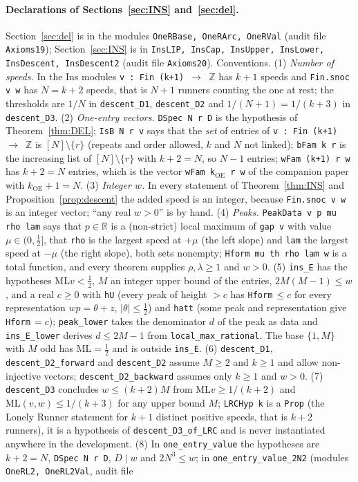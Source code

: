 \documentclass[11pt]{article}
\theoremstyle{definition}
\theoremstyle{remark}
\newcommand{\ML}{\mathrm{ML}}
\newcommand{\ZZ}{\mathbb{Z}}
\newcommand{\RR}{\mathbb{R}}
\begin{document}
\paragraph{Declarations of Sections~\ref{sec:INS} and~\ref{sec:del}.}
Section~\ref{sec:del} is in the modules \texttt{OneRBase, OneRArc, OneRVal} (audit file \texttt{Axioms19}); Section~\ref{sec:INS} is in \texttt{InsLIP, InsCap, InsUpper, InsLower, InsDescent, InsDescent2} (audit file \texttt{Axioms20}). Conventions. (1) \emph{Number of speeds.} In the Ins modules \texttt{v : Fin (k+1) $\to$ $\ZZ$} has $k+1$ speeds and \texttt{Fin.snoc v w} has $N=k+2$ speeds, that is $N+1$ runners counting the one at rest; the thresholds are $1/N$ in \texttt{descent\_D1}, \texttt{descent\_D2} and $1/(N+1)=1/(k+3)$ in \texttt{descent\_D3}. (2) \emph{One-entry vectors.} \texttt{DSpec N r D} is the hypothesis of Theorem~\ref{thm:DEL}; \texttt{IsB N r v} says that the \emph{set} of entries of \texttt{v : Fin (k+1) $\to$ $\ZZ$} is $[N]\setminus\{r\}$ (repeats and order allowed, $k$ and $N$ not linked); \texttt{bFam k r} is the increasing list of $[N]\setminus\{r\}$ with $k+2=N$, so $N-1$ entries; \texttt{wFam (k+1) r w} has $k+2=N$ entries, which is the vector \texttt{wFam k$_{\mathrm{OE}}$ r w} of the companion paper~\cite{A1} with $k_{\mathrm{OE}}+1=N$. (3) \emph{Integer $w$.} In every statement of Theorem~\ref{thm:INS} and Proposition~\ref{prop:descent} the added speed is an integer, because \texttt{Fin.snoc v w} is an integer vector; ``any real $w>0$'' is by hand. (4) \emph{Peaks.} \texttt{PeakData v p mu rho lam} says that $p\in\RR$ is a (non-strict) local maximum of \texttt{gap v} with value $\mu\in(0,\frac12]$, that \texttt{rho} is the largest speed at $+\mu$ (the left slope) and \texttt{lam} the largest speed at $-\mu$ (the right slope), both sets nonempty; \texttt{Hform mu th rho lam w} is a total function, and every theorem supplies $\rho,\lambda\ge1$ and $w>0$. (5) \texttt{ins\_E} has the hypotheses $\ML v<\frac12$, $M$ an integer upper bound of the entries, $2M(M-1)\le w$, and a real $c\ge0$ with \texttt{hU} (every peak of height $>c$ has \texttt{Hform}$\,\le c$ for every representation $wp=\theta+z$, $|\theta|\le\frac12$) and \texttt{hatt} (some peak and representation give \texttt{Hform}$\,=c$); \texttt{peak\_lower} takes the denominator $d$ of the peak as data and \texttt{ins\_E\_lower} derives $d\le2M-1$ from \texttt{local\_max\_rational}. The base $\{1,M\}$ with $M$ odd has $\ML=\frac12$ and is outside \texttt{ins\_E}. (6) \texttt{descent\_D1}, \texttt{descent\_D2\_forward} and \texttt{descent\_D2} assume $M\ge2$ and $k\ge1$ and allow non-injective vectors; \texttt{descent\_D2\_backward} assumes only $k\ge1$ and $w>0$. (7) \texttt{descent\_D3} concludes $w\le(k+2)M$ from $\ML v\ge1/(k+2)$ and $\ML(v,w)\le1/(k+3)$ for any upper bound $M$; \texttt{LRCHyp k} is a \texttt{Prop} (the Lonely Runner statement for $k+1$ distinct positive speeds, that is $k+2$ runners), it is a hypothesis of \texttt{descent\_D3\_of\_LRC} and is never instantiated anywhere in the development. (8) In \texttt{one\_entry\_value} the hypotheses are $k+2=N$, \texttt{DSpec N r D}, $D\mid w$ and $2N^3\le w$; in \texttt{one\_entry\_value\_2N2} (modules \texttt{OneRL2, OneRL2Val}, audit file 
\end{document}
